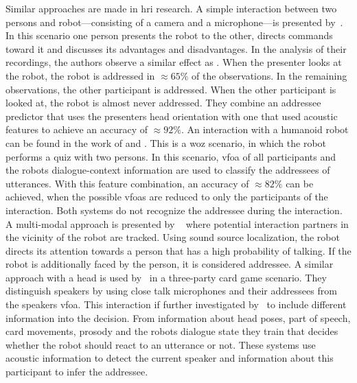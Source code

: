 Similar approaches are made in \Gls{hri} research.
A simple interaction between two persons and \gls{robot}---consisting of a camera and a microphone---is presented by~.
In this scenario one person presents the \gls{robot} to the other, directs commands toward it and discusses its advantages and disadvantages.
In the analysis of their recordings, the authors observe a similar effect as .
When the presenter looks at the \gls{robot}, the \gls{robot} is addressed in \(\approx 65\%\) of the observations.
In the remaining observations, the other participant is addressed.
When the other participant is looked at, the \gls{robot} is almost never addressed.
They combine an \gls{addressee} predictor that uses the presenters head orientation with one that used acoustic features to achieve an \gls{accuracy} of \(\approx 92\%\).
An interaction with a humanoid \gls{robot} can be found in the work of  and .
This is a \gls{woz} scenario, in which the \gls{robot} performs a quiz with two persons.
In this scenario, \gls{vfoa} of all participants and the \glspl{robot} dialogue-context information are used to classify the \glspl{addressee} of utterances.
With this feature combination, an \gls{accuracy} of \(\approx 82\%\) can be achieved, when the possible \glspl{vfoa} are reduced to only the participants of the interaction.
Both systems do not recognize the \gls{addressee} during the interaction.
% 
A multi-modal approach is presented by ~ where potential interaction partners in the vicinity of the \gls{robot} are tracked.
Using sound source localization, the \gls{robot} directs its attention towards a person that has a high probability of talking.
If the \gls{robot} is additionally faced by the person, it is considered \gls{addressee}.
A similar approach with a  head is used by~ in a three-party card game scenario.
They distinguish \glspl{speaker} by using close talk microphones and their \glspl{addressee} from the \glspl{speaker} \gls{vfoa}.
This interaction if further investigated by~ to include different information into the decision.
From information about head poses, part of speech, card movements, prosody and the \glspl{robot} dialogue state they train  that decides whether the \gls{robot} should react to an utterance or not.
These systems use acoustic information to detect the current \gls{speaker} and information about this participant to infer the \gls{addressee}.
